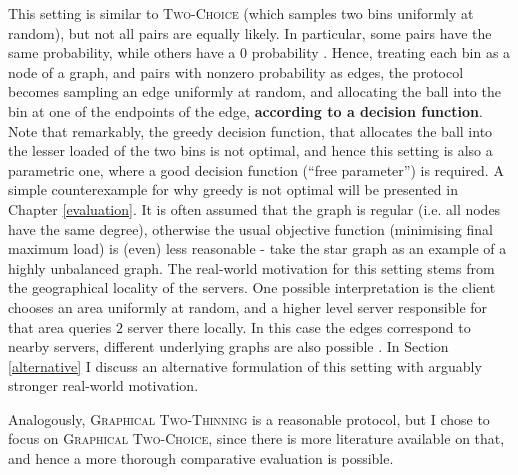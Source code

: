 This setting is similar to \textsc{Two-Choice} (which samples two bins uniformly at random), but not all pairs are equally likely. In particular, some pairs have the same probability, while others have a $0$ probability . Hence, treating each bin as a node of a graph, and pairs with nonzero probability as edges, the protocol becomes sampling an edge uniformly at random, and allocating the ball into the bin at one of the endpoints of the edge, \textbf{according to a decision function}. Note that remarkably, the greedy decision function, that allocates the ball into the lesser loaded of the two bins is not optimal, and hence this setting is also a parametric one, where a good decision function (``free parameter'') is required. A simple counterexample for why greedy is not optimal will be presented in Chapter \ref{evaluation}. It is often assumed that the graph is regular (i.e. all nodes have the same degree), otherwise the usual objective function (minimising final maximum load) is (even) less reasonable - take the star graph as an example of a highly unbalanced graph. The real-world motivation for this setting stems from the geographical locality of the servers. One possible interpretation is the client chooses an area uniformly at random, and a higher level server responsible for that area queries $2$ server there locally. In this case the edges correspond to nearby servers, different underlying graphs are also possible \cite{peres2015oneplusbeta}. In Section \ref{alternative} I discuss an alternative formulation of this setting with arguably stronger real-world motivation.

Analogously, \textsc{Graphical Two-Thinning} is a reasonable protocol, but I chose to focus on \textsc{Graphical Two-Choice}, since there is more literature available on that, and hence a more thorough comparative evaluation is possible.\\


